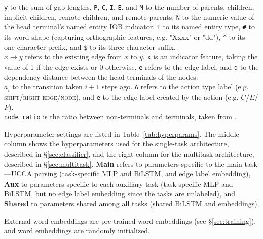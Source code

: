 \documentclass[11pt,a4paper]{article}
\begin{document}
\begin{table}[h]
{\texttt{y} to the sum of gap lengths,
\texttt{P}, \texttt{C}, \texttt{I}, \texttt{E}, and \texttt{M} to the number of
parents, children, implicit children, remote children, and remote parents,
\texttt{N} to the numeric value of the head terminal's named entity IOB indicator,
\texttt{T} to its named entity type,
\texttt{\#} to its word shape (capturing orthographic features, e.g. "Xxxx" or "dd"),
\texttt{\^{}} to its one-character prefix, and
\texttt{\$} to its three-character suffix.
\\
$x \to y$ refers to the existing edge from $x$ to $y$.
\texttt{x} is an indicator feature, taking the value of 1 if the edge exists or 0 otherwise,
\texttt{e} refers to the edge label, and
\texttt{d} to the dependency distance between the head terminals of the nodes.
\\
$a_i$ to the transition taken $i+1$ steps ago.
\texttt{A} refers to the action type label (e.g. \textsc{shift}/\textsc{right-edge}/\textsc{node}), and
\texttt{e} to the edge label created by the action (e.g. $C$/$E$/$P$).
\\
\texttt{node ratio} is the ratio between non-terminals and terminals, taken from \citet{hershcovich2017a}.
}
\end{table}

Hyperparameter settings are listed in Table~\ref{tab:hyperparams}.
The middle column shows the hyperparameters used for the single-task architecture,
described in \S\ref{sec:classifier}, and
the right column for the multitask architecture,
described in \S\ref{sec:multitask}.
\textbf{Main} refers to parameters specific to the main task---UCCA parsing
(task-specific MLP and BiLSTM, and edge label embedding),
\textbf{Aux} to parameters specific to each auxiliary task
(task-specific MLP and BiLSTM, but no edge label embedding since the tasks are unlabeled),
and \textbf{Shared} to parameters shared among all tasks
(shared BiLSTM and embeddings).

External word embeddings are pre-trained word embeddings (see \S\ref{sec:training}),
and word embeddings are randomly initialized.
\end{document}
